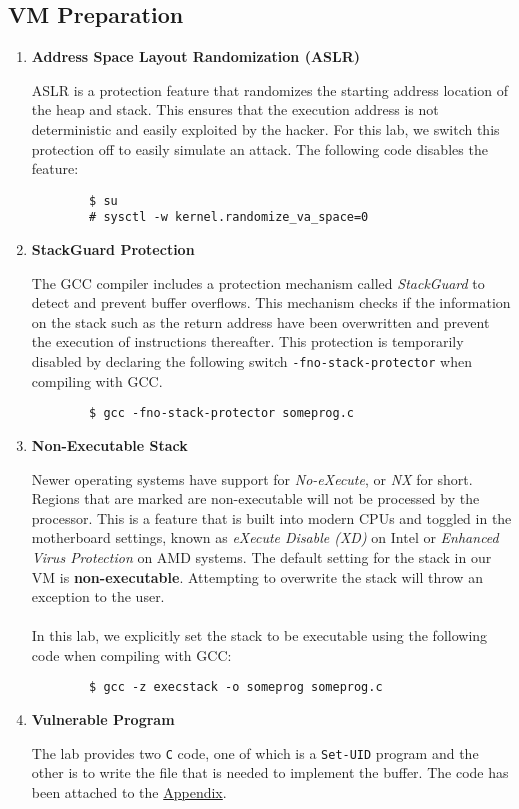 \documentclass[a4paper,12pt]{article}
\begin{document}
\subsection{VM Preparation}
\vspace{1em}
\begin{enumerate}
	\item \textbf{Address Space Layout Randomization (ASLR)} \begin{par}ASLR is a protection feature that randomizes the starting address location of the heap and stack. This ensures that the execution address is not deterministic and easily exploited by the hacker. For this lab, we switch this protection off to easily simulate an attack. The following code disables the feature:
		\begin{verbatim}
		$ su
		# sysctl -w kernel.randomize_va_space=0
		\end{verbatim}
	\end{par}
	\item \textbf{StackGuard Protection}\begin{par}The GCC compiler includes a protection mechanism called \textit{StackGuard} to detect and prevent buffer overflows. This mechanism checks if the information on the stack such as the return address have been overwritten and prevent the execution of instructions thereafter. This protection is temporarily disabled by declaring the following switch \texttt{-fno-stack-protector} when compiling with GCC.\begin{verbatim}
		$ gcc -fno-stack-protector someprog.c\end{verbatim}
	\end{par}
	\item \textbf{Non-Executable Stack}\begin{par}Newer operating systems have support for \textit{No-eXecute}, or \textit{NX} for short. Regions that are marked are non-executable will not be processed by the processor. This is a feature that is built into modern CPUs and toggled in the motherboard settings, known as \textit{eXecute Disable (XD)} on Intel or \textit{Enhanced Virus Protection} on AMD systems. The default setting for the stack in our VM is  \textbf{non-executable}. Attempting to overwrite the stack will throw an exception to the user. \\\\In this lab, we explicitly set the stack to be executable using the following code when compiling with GCC:
		\begin{verbatim}
		$ gcc -z execstack -o someprog someprog.c
		\end{verbatim}
	\end{par}
	\item \textbf{Vulnerable Program}\begin{par}
		The lab provides two \texttt{C} code, one of which is a \texttt{Set-UID} program and the other is to write the file that is needed to implement the buffer. The code has been attached to the \hyperref[App]{Appendix}.\end{par}
\end{enumerate}
\end{document}
